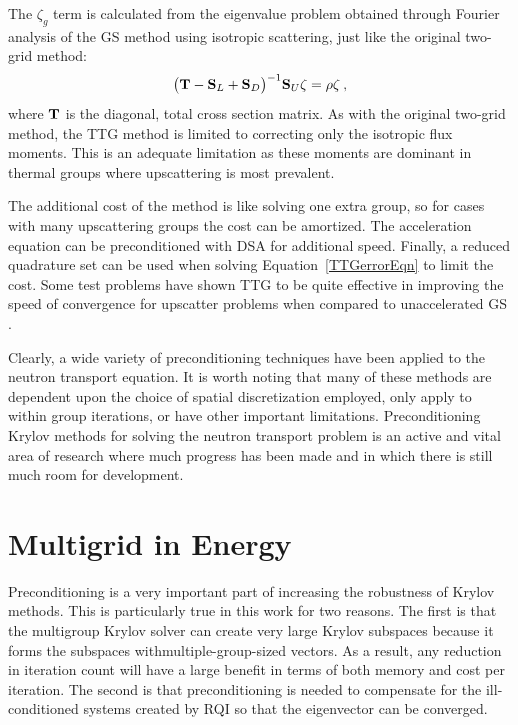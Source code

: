 The $\zeta_g$ term is calculated from the eigenvalue problem obtained through Fourier analysis of the GS method using isotropic scattering, just like the original two-grid method:
%
\begin{equation}
  \bigl(\mathbf{T} - \mathbf{S}_L + \mathbf{S}_D\bigr)^{-1} \mathbf{S}_U\zeta = \rho\zeta \:,
\end{equation}
where $\mathbf{T}$ is the diagonal, total cross section matrix. As with the original two-grid method, the TTG method is limited to correcting only the isotropic flux moments. This is an adequate limitation as these moments are dominant in thermal groups where upscattering is most prevalent\cite{Evans2009d}.   

The additional cost of the method is like solving one extra group, so for cases with many upscattering groups the cost can be amortized. The acceleration equation can be preconditioned with DSA for additional speed. Finally, a reduced quadrature set can be used when solving Equation~\eqref{TTGerrorEqn} to limit the cost. Some test problems have shown TTG to be quite effective in improving the speed of convergence for upscatter problems when compared to unaccelerated GS \cite{Evans2009d}.

Clearly, a wide variety of preconditioning techniques have been applied to the neutron transport equation. It is worth noting that many of these methods are dependent upon the choice of spatial discretization employed, only apply to within group iterations, or have other important limitations. Preconditioning Krylov methods for solving the neutron transport problem is an active and vital area of research where much progress has been made and in which there is still much room for development. 

\section{Multigrid in Energy}
Preconditioning is a very important part of increasing the robustness of Krylov methods. This is particularly true in this work for two reasons. The first is that the multigroup Krylov solver can create very large Krylov subspaces because it forms the subspaces withmultiple-group-sized vectors. As a result, any reduction in iteration count will have a large benefit in terms of both memory and cost per iteration. The second is that preconditioning is needed to compensate for the ill-conditioned systems created by RQI so that the eigenvector can be converged. 

